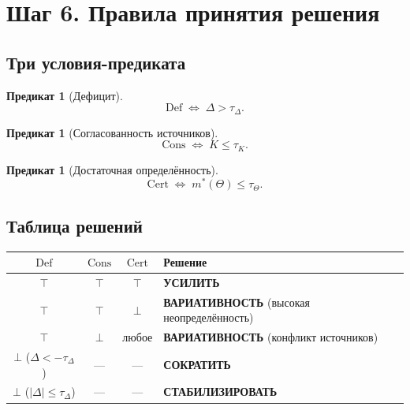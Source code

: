 \documentclass[12pt,a4paper]{article}
\newtheorem{predicate}[definition]{Предикат}
\begin{document}
\section{Шаг 6. Правила принятия решения}

\subsection{Три условия-предиката}

\begin{predicate}[Дефицит]
  \[
    \mathrm{Def} \;\Longleftrightarrow\; \Delta > \tau_\Delta.
  \]
\end{predicate}

\begin{predicate}[Согласованность источников]
  \[
    \mathrm{Cons} \;\Longleftrightarrow\; K \le \tau_K.
  \]
\end{predicate}

\begin{predicate}[Достаточная определённость]
  \[
    \mathrm{Cert} \;\Longleftrightarrow\; m^*(\Theta) \le \tau_\Theta.
  \]
\end{predicate}

\subsection{Таблица решений}

\begin{center}
\renewcommand{\arraystretch}{1.4}
\begin{tabular}{ccc l}
\toprule
$\mathrm{Def}$ & $\mathrm{Cons}$ & $\mathrm{Cert}$ & Решение \\
\midrule
$\top$ & $\top$ & $\top$ & \textbf{УСИЛИТЬ} \\
$\top$ & $\top$ & $\bot$ & \textbf{ВАРИАТИВНОСТЬ} (высокая неопределённость) \\
$\top$ & $\bot$ & любое  & \textbf{ВАРИАТИВНОСТЬ} (конфликт источников) \\
$\bot$ ($\Delta < -\tau_\Delta$) & --- & --- & \textbf{СОКРАТИТЬ} \\
$\bot$ ($|\Delta| \le \tau_\Delta$) & --- & --- & \textbf{СТАБИЛИЗИРОВАТЬ} \\
\bottomrule
\end{tabular}
\end{center}
\end{document}
